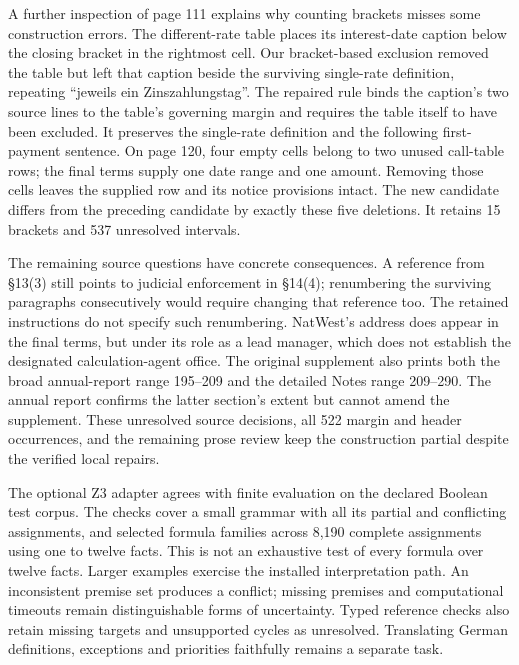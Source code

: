 A further inspection of page 111 explains why counting brackets misses some
construction errors. The different-rate table places its interest-date caption
below the closing bracket in the rightmost cell. Our bracket-based exclusion
removed the table but left that caption beside the surviving single-rate
definition, repeating ``jeweils ein Zinszahlungstag''. The repaired rule binds
the caption's two source lines to the table's governing margin and requires the
table itself to have been excluded. It preserves the single-rate definition and
the following first-payment sentence. On page 120, four empty cells belong to
two unused call-table rows; the final terms supply one date range and one amount.
Removing those cells leaves the supplied row and its notice provisions intact.
The new candidate differs from the preceding candidate by exactly these five
deletions. It retains 15 brackets and 537 unresolved intervals.

The remaining source questions have concrete consequences. A reference from
\S13(3) still points to judicial enforcement in \S14(4); renumbering the
surviving paragraphs consecutively would require changing that reference too.
The retained instructions do not specify such renumbering. NatWest's address
does appear in the final terms, but under its role as a lead manager, which does
not establish the designated calculation-agent office. The original supplement
also prints both the broad annual-report range 195--209 and the detailed Notes
range 209--290. The annual report confirms the latter section's extent but
cannot amend the supplement. These unresolved source decisions, all 522 margin
and header occurrences, and the remaining prose review keep the construction
partial despite the verified local repairs.

\begingroup
{}
The optional Z3 adapter agrees with finite evaluation on the declared Boolean
test corpus. The checks cover a small grammar with all its partial and conflicting
assignments, and selected formula families across 8,190 complete assignments
using one to twelve facts. This is not an exhaustive test of every formula over
twelve facts. Larger examples exercise the installed interpretation path. An
inconsistent premise set produces a conflict; missing premises and computational
timeouts remain distinguishable forms of uncertainty. Typed reference checks
also retain missing targets and unsupported cycles as unresolved. Translating
German definitions, exceptions and priorities faithfully remains a separate task.
\par\endgroup

